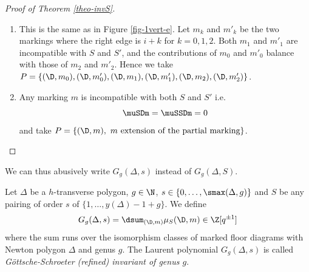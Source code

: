 \begin{proof}[Proof of Theorem \ref{theo-invS}]
\begin{enumerate}[label=(\alph*)]
\begin{table}[ht]
\renewcommand{\arraystretch}{1.5}
\centering
\[ 
\begin{array}{|c||c|c|}
\hline
  & S  & S' \\
\hline
\hline
(i,i+1,i+2) & \dfrac{[\omega_1][\omega_2][\omega_1 + \omega_2]}{[2]} [\omega_3]^2 & \dfrac{[\omega_2][\omega_3][\omega_2 + \omega_3]}{[2]} [\omega_1]^2  \\
\hline 
(i,i+2,i+1) & 0 & \dfrac{[\omega_2][\omega_3][\omega_2 + \omega_3]}{[2]} [\omega_1]^2   \\
\hline 
(i+1,i,i+2) & \dfrac{[\omega_1][\omega_2][\omega_1 + \omega_2]}{[2]} [\omega_3]^2 & 0   \\
\hline 
(i+1,i+2,i) & 0 & \dfrac{[\omega_1][\omega_2][\omega_1 + \omega_2]}{[2]} [\omega_3]^2   \\
\hline 
(i+2,i,i+1) & \dfrac{[\omega_2][\omega_3][\omega_2 + \omega_3]}{[2]} [\omega_1]^2 & 0  \\
\hline 
(i+2,i+1,i) & \dfrac{[\omega_2][\omega_3][\omega_2 + \omega_3]}{[2]} [\omega_1]^2 & \dfrac{[\omega_1][\omega_2][\omega_1 + \omega_2]}{[2]} [\omega_3]^2    \\
\hline 
\end{array} \]
\caption{Contribution of the markings in case (b).}
\label{table-contrib-0vert-b}
\end{table}

\item This is the same as in Figure \ref{fig-1vert-e}. Let $m_k$ and $m'_k$ be the two markings where the right edge is $i+k$ for $k=0,1,2$. Both $m_1$ and $m'_1$ are incompatible with $S$ and $S'$, and the contributions of $m_0$ and $m'_0$ balance with those of $m_2$ and $m'_2$. Hence we take $P = \{ (\D,m_0), (\D,m'_0), (\D,m_1), (\D,m'_1), (\D,m_2), (\D,m'_2) \}$.

\item Any marking $m$ is incompatible with both $S$ and $S'$ i.e.  
\[ \muSDm = \muSSDm = 0 \]
and take $P = \{(\D,m),\ m \text{ extension of the partial marking} \}$.
\end{enumerate}
\end{proof}

We can thus abusively write $G_g(\Delta,s)$ instead of $G_g(\Delta,S)$.\begin{defi}\label{def-combi-GS-inv}
Let $\Delta$ be a $h$-transverse polygon, $g\in\N$, $s\in \{0,\dots,\smax(\Delta,g)\}$ and $S$ be any pairing  of order $s$ of $\{1,\dots, y(\Delta)-1+g \}$. We define 
\[ G_g(\Delta,s) = \dsum_{(\D,m)} \mu_S(\D,m) \in \Z[q^{\pm1}] \]
where the sum runs over the isomorphism classes of marked floor diagrams with Newton polygon $\Delta$ and genus $g$.
The Laurent polynomial $G_g(\Delta,s)$ is called \emph{Göttsche-Schroeter (refined) invariant of genus $g$}.
\end{defi}




